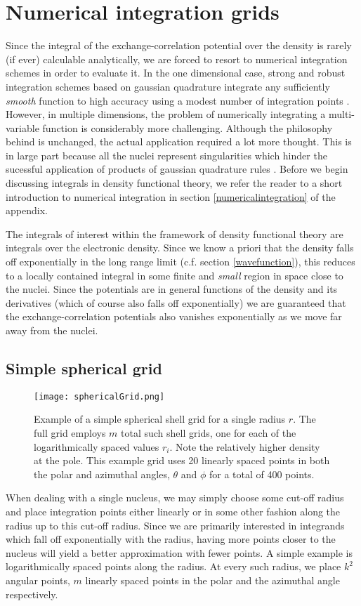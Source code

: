 \documentclass[../../master.tex]{subfiles}
\begin{document}
\section{Numerical integration grids}
Since the integral of the exchange-correlation potential over the density is rarely (if ever) calculable analytically, we are forced to resort to numerical integration schemes in order to evaluate it. In the one dimensional case, strong and robust integration schemes based on gaussian quadrature integrate any sufficiently \emph{smooth} function to high accuracy using a modest number of integration points \cite{hjorthjensen}. However, in multiple dimensions, the problem of numerically integrating a multi-variable function is considerably more challenging. Although the philosophy behind is unchanged, the actual application required a lot more thought. This is in large part because all the nuclei represent singularities which hinder the sucessful application of products of gaussian quadrature rules \cite{voronoi1}. Before we begin discussing integrals in density functional theory, we refer the reader to a short introduction to numerical integration in section \ref{numericalintegration} of the appendix. 

The integrals of interest within the framework of density functional theory are integrals over the electronic density. Since we know a priori that the density falls off exponentially in the long range limit (c.f. section \ref{wavefunction}), this reduces to a locally contained integral in some finite and \emph{small} region in space close to the nuclei. Since the potentials are in general functions of the density and its derivatives (which of course also falls off exponentially) we are guaranteed that the exchange-correlation potentials also vanishes exponentially as we move far away from the nuclei. 

\subsection{Simple spherical grid}
\begin{SCfigure}
\centering
\texttt{[image: sphericalGrid.png]}
\caption{Example of a simple spherical shell grid for a single radius $r$. The full grid employs $m$ total such shell grids, one for each of the logarithmically spaced values $r_i$. Note the relatively higher density at the pole. This example grid uses 20 linearly spaced points in both the polar and azimuthal angles, $\theta$ and $\phi$ for a total of 400 points.\label{fig:dft2}}
\end{SCfigure}
When dealing with a single nucleus, we may simply choose some cut-off radius and place integration points either linearly or in some other fashion along the radius up to this cut-off radius. Since we are primarily interested in integrands which fall off exponentially with the radius, having more points closer to the nucleus will yield a better approximation with fewer points. A simple example is logarithmically spaced points along the radius. At every such radius, we place $k^2$ angular points, $m$ linearly spaced points in the polar and the azimuthal angle respectively.
\end{document}
